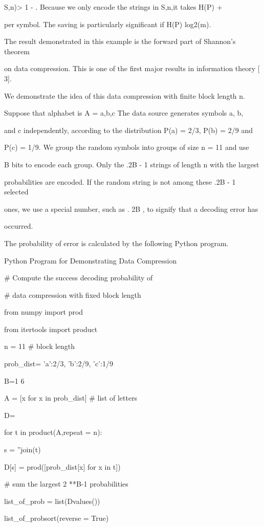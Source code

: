 S\delta,n)> 1 - \epsilon. Because we only encode the strings in S\delta,n,it takes H(P) + \deltabits

per symbol. The saving is particularly significant if H(P) \ll log2(m).

The result demonstrated in this example is the forward part of Shannon's theorem

on data compression. This is one of the first major results in information theory [ 3].

We demonstrate the idea of this data compression with finite block length n.

Suppose that alphabet is A ={ a,b,c }The data source generates symbols a, b,

and c independently, according to the distribution P(a) = 2/3, P(b) = 2/9 and

P(c) = 1/9. We group the random symbols into groups of size n = 11 and use

B bits to encode each group. Only the .2B - 1 strings of length n with the largest

probabilities are encoded. If the random string is not among these .2B - 1 selected

ones, we use a special number, such as . 2B , to signify that a decoding error has

occurred.

The probability of error is calculated by the following Python program.

Python Program for Demonstrating Data Compression

# Compute the success decoding probability of

# data compression with fixed block length

from numpy import prod

from itertools import product

n = 11 # block length

prob_dist= {'a':2/3, 'b':2/9, 'c':1/9}

B=1 6

A = [x for x in prob_dist] # list of letters

D={}

for t in product(A,repeat = n):

s = ''join(t)

D[s] = prod([prob_dist[x] for x in t])

# sum the largest 2 **B-1 probabilities

list_of_prob = list(Dvalues())

list_of_probsort(reverse = True)

